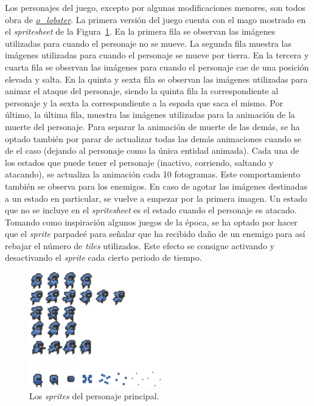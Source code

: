 Los personajes del juego, excepto por algunas modificaciones menores, son todos obra de \textit{\href{https://o-lobster.itch.io/}{o\_lobster}}. La primera versión del juego cuenta con el mago mostrado en el \textit{spritesheet} de la Figura~\ref{fig:hero}. En la primera fila se observan las imágenes utilizadas para cuando el personaje no se mueve. La segunda fila muestra las imágenes utilizadas para cuando el personaje se mueve por tierra. En la tercera y cuarta fila se observan las imágenes para cuando el personaje cae de una posición elevada y salta. En la quinta y sexta fila se observan las imágenes utilizadas para animar el ataque del personaje, siendo la quinta fila la correspondiente al personaje y la sexta la correspondiente a la espada que saca el mismo. Por último, la última fila, muestra las imágenes utilizadas para la animación de la muerte del personaje. Para separar la animación de muerte de las demás, se ha optado también por parar de actualizar todas las demás animaciones cuando se de el caso (dejando al personaje como la única entidad animada). Cada una de los estados que puede tener el personaje (inactivo, corriendo, saltando y atacando), se actualiza la animación cada 10 fotogramas. Este comportamiento también se observa para los enemigos. En caso de agotar las imágenes destinadas a un estado en particular, se vuelve a empezar por la primera imagen. Un estado que no se incluye en el \textit{spritesheet} es el estado cuando el personaje es atacado. Tomando como inspiración algunos juegos de la época, se ha optado por hacer que el \textit{sprite} parpadeé para señalar que ha recibido daño de un enemigo para así rebajar el número de \textit{tiles} utilizados. Este efecto se consigue activando y desactivando el \textit{sprite} cada cierto periodo de tiempo.

\begin{figure}[h]
	\centering
	\includegraphics[height=5cm]{capitulos/capitulo6/hero.png}
	\caption{Los \textit{sprites} del personaje principal.}\label{fig:hero}
\end{figure}
\FloatBarrier{}

